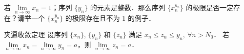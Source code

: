 \begin{exercise}{}
  若 $\lim\limits_{n\rightarrow \infty} x_n=1$；序列 $\{y_n\}$ 的元素是整数．那么序列 $\{x_n^{y_n}\}$  的极限是否一定存在？请举一个 $\{x_n^{y_n}\}$ 的极限存在且不为 $1$ 的例子．
\end{exercise}

\begin{theorem}{夹逼收敛定理}
  设序列 $\{x_n\}$, $\{y_n\}$ 和 $\{z_n\}$ 满足 $x_n\leq z_n\leq y_n,\ \forall n>N_0$．
若 $\lim\limits_{n\rightarrow \infty}x_n=\lim\limits_{n\rightarrow \infty}y_n=a$，则 $\lim\limits_{n\rightarrow \infty}z_n=a$．
\end{theorem}